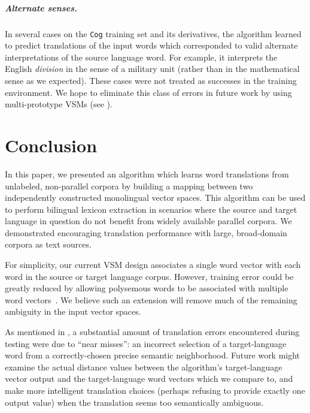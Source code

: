 \documentclass[11pt]{article}
\begin{document}
\subparagraph{Alternate senses.} In several cases on the \texttt{Cog} training
set and its derivatives, the algorithm learned to predict translations of the
input words which corresponded to valid alternate interpretations of the source
language word. For example, it interprets the English \textit{division} in the
sense of a military unit (rather than in the mathematical sense as we expected).
These cases were not treated as successes in the  training
environment. We hope to eliminate this class of errors in future work by using
multi-prototype VSMs (see ).


\section{Conclusion}
\label{sec:conclusion}

In this paper, we presented an algorithm which learns word translations from
unlabeled, non-parallel corpora by building a mapping between two independently
constructed monolingual vector spaces. This algorithm can be used to perform
bilingual lexicon extraction in scenarios where the source and target language
in question do not benefit from widely available parallel corpora. We
demonstrated encouraging translation performance with large, broad-domain
corpora as text sources.

For simplicity, our current VSM design associates a single word vector with each
word in the source or target language corpus. However, training error could be
greatly reduced by allowing polysemous words to be associated with multiple word
vectors~\cite{reisinger2010,huang2012}. We believe such an extension will remove
much of the remaining ambiguity in the input vector spaces.

As mentioned in , a substantial amount of
translation errors encountered during testing were due to ``near misses'': an
incorrect selection of a target-language word from a correctly-chosen precise
semantic neighborhood. Future work might examine the actual distance values
between the algorithm's target-language vector output and the target-language
word vectors which we compare to, and make more intelligent translation choices
(perhaps refusing to provide exactly one output value) when the translation
seems too semantically ambiguous. %




\end{document}
